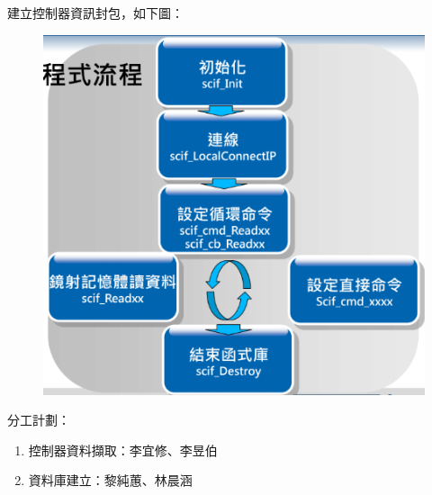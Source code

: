 \documentclass[12pt, a4paper]{article}
\begin{document}
\begin{CJK*}{UTF8}{bkai}
建立控制器資訊封包，如下圖：
\begin{figure}[H]
  \centering
  \includegraphics[scale=0.5]{controller2.png}
\end{figure}

分工計劃：
\begin{enumerate}
  \item 控制器資料擷取：李宜修、李昱伯
  \item 資料庫建立：黎純蕙、林晨涵
\end{enumerate}
\end{CJK*}
\end{document}
